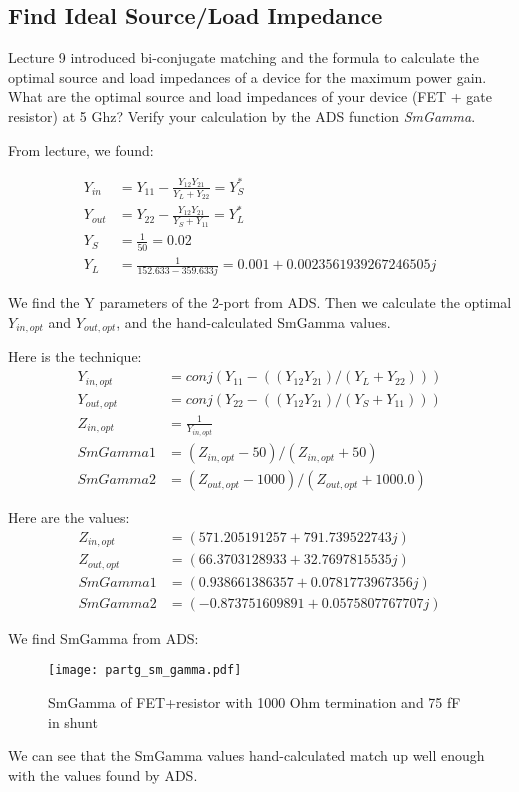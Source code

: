 \subsection{Find Ideal Source/Load Impedance}
{\color{blue} Lecture 9 introduced bi-conjugate matching and the formula to calculate the optimal source and load impedances of a device for the maximum power gain.
What are the optimal source and load impedances of your device (FET + gate resistor) at 5 Ghz?
Verify your calculation by the ADS function \emph{SmGamma}.}

From lecture, we found:

\begin{align*}
    Y_{in} &= Y_{11} - \frac{Y_{12}Y_{21}}{Y_L + Y_{22}} = Y_S^* \\
    Y_{out} &= Y_{22} - \frac{Y_{12}Y_{21}}{Y_S + Y_{11}} = Y_L^* \\
    Y_S &= \frac{1}{50} = 0.02 \\
    Y_L &= \frac{1}{152.633-359.633j} = 0.001+0.0023561939267246505j
\end{align*}

We find the Y parameters of the 2-port from ADS. Then we calculate the optimal $Y_{in,opt}$ and $Y_{out,opt}$, and the hand-calculated SmGamma values.

Here is the technique:
\begin{align*}
    Y_{in,opt} &= conj(Y_{11} - ((Y_{12}Y_{21}) / (Y_L + Y_{22}))) \\
    Y_{out,opt} &= conj(Y_{22} - ((Y_{12}Y_{21}) / (Y_S + Y_{11}))) \\
    Z_{in,opt} &= \frac{1}{Y_{in,opt}} \\
    SmGamma1 &= (Z_{in,opt} - 50) / (Z_{in,opt} + 50) \\
    SmGamma2 &= (Z_{out,opt} - 1000) / (Z_{out,opt} + 1000.0)
\end{align*}

Here are the values:
\begin{align*}
    Z_{in,opt} &= (571.205191257+791.739522743j) \\
    Z_{out,opt} &= (66.3703128933+32.7697815535j) \\
    SmGamma1 &= (0.938661386357+0.0781773967356j) \\
    SmGamma2 &= (-0.873751609891+0.0575807767707j)
\end{align*}

We find SmGamma from ADS:
\begin{figure}[H]
    \centering \texttt{[image: partg\_sm\_gamma.pdf]}
    \caption{SmGamma of FET+resistor with 1000 Ohm termination and 75 fF in shunt}
\end{figure}

We can see that the SmGamma values hand-calculated match up well enough with the values found by ADS.

